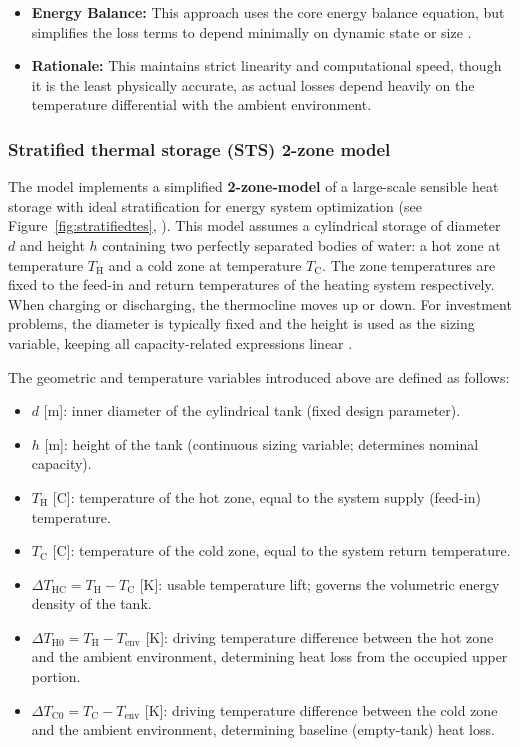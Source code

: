\documentclass[11pt,a4paper]{report}
\begin{document}
\begin{itemize}
    \item \textbf{Energy Balance:} This approach uses the core energy balance equation, but simplifies the loss terms to depend minimally on dynamic state or size \cite{Krien2020oemofsolph}.
    \item \textbf{Rationale:} This maintains strict linearity and computational speed, though it is the least physically accurate, as actual losses depend heavily on the temperature differential with the ambient environment.
\end{itemize}

\subsubsection{Stratified thermal storage (STS) 2-zone model}
\label{sub:sts_model}
The model implements a simplified \textbf{2-zone-model} of a large-scale sensible heat storage with ideal stratification for energy system optimization (see Figure~\ref{fig:stratifiedtes}, \cite{Krien2020oemofsolph}). This model assumes a cylindrical storage of diameter $d$ and height $h$ containing two perfectly separated bodies of water: a hot zone at temperature $T_{\text{H}}$ and a cold zone at temperature $T_{\text{C}}$. The zone temperatures are fixed to the feed-in and return temperatures of the heating system respectively. When charging or discharging, the thermocline moves up or down. For investment problems, the diameter is typically fixed and the height is used as the sizing variable, keeping all capacity-related expressions linear \cite{Krien2020oemofsolph}.

\noindent The geometric and temperature variables introduced above are defined as follows:
\begin{itemize}
    \item $d$ [m]: inner diameter of the cylindrical tank (fixed design parameter).
    \item $h$ [m]: height of the tank (continuous sizing variable; determines nominal capacity).
    \item $T_{\text{H}}$ [\textdegree C]: temperature of the hot zone, equal to the system supply (feed-in) temperature.
    \item $T_{\text{C}}$ [\textdegree C]: temperature of the cold zone, equal to the system return temperature.
    \item $\Delta T_{\text{HC}} = T_{\text{H}} - T_{\text{C}}$ [K]: usable temperature lift; governs the volumetric energy density of the tank.
    \item $\Delta T_{\text{H0}} = T_{\text{H}} - T_{\text{env}}$ [K]: driving temperature difference between the hot zone and the ambient environment, determining heat loss from the occupied upper portion.
    \item $\Delta T_{\text{C0}} = T_{\text{C}} - T_{\text{env}}$ [K]: driving temperature difference between the cold zone and the ambient environment, determining baseline (empty-tank) heat loss.
\end{itemize}
\end{document}
